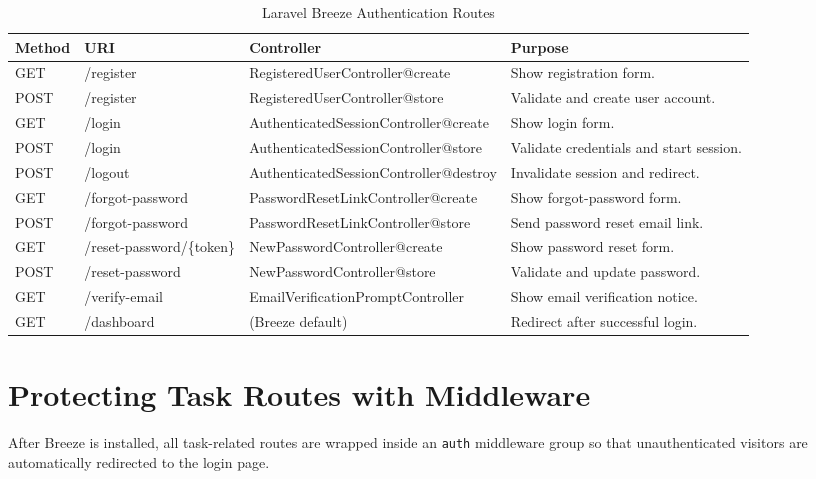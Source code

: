 \documentclass[12pt,a4paper]{report}
\begin{document}
\begin{titlepage}
\begin{table}[h!]
\centering
\caption{Laravel Breeze Authentication Routes}
\label{tab:authroutes}
\renewcommand{\arraystretch}{1.3}
\begin{tabularx}{\textwidth}{@{}lllX@{}}
\toprule
\textbf{Method} & \textbf{URI} & \textbf{Controller} & \textbf{Purpose} \\
\midrule
GET  & /register              & RegisteredUserController@create   & Show registration form. \\
POST & /register              & RegisteredUserController@store    & Validate and create user account. \\
GET  & /login                 & AuthenticatedSessionController@create  & Show login form. \\
POST & /login                 & AuthenticatedSessionController@store   & Validate credentials and start session. \\
POST & /logout                & AuthenticatedSessionController@destroy & Invalidate session and redirect. \\
GET  & /forgot-password       & PasswordResetLinkController@create    & Show forgot-password form. \\
POST & /forgot-password       & PasswordResetLinkController@store     & Send password reset email link. \\
GET  & /reset-password/\{token\} & NewPasswordController@create       & Show password reset form. \\
POST & /reset-password        & NewPasswordController@store           & Validate and update password. \\
GET  & /verify-email          & EmailVerificationPromptController     & Show email verification notice. \\
GET  & /dashboard             & (Breeze default)                      & Redirect after successful login. \\
\bottomrule
\end{tabularx}
\end{table}

\section{Protecting Task Routes with Middleware}

After Breeze is installed, all task-related routes are wrapped inside an
\texttt{auth} middleware group so that unauthenticated visitors are automatically
redirected to the login page.


\end{titlepage}
\end{document}
